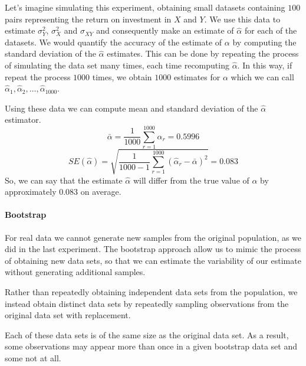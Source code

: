Let's imagine simulating this experiment, obtaining small datasets containing $100$ pairs representing the return on investment in $X$ and $Y$. We use this data to estimate $\sigma^2_Y$, $\sigma^2_X$ and $\sigma_{XY}$ and consequently make an estimate of $\hat \alpha$ for each of the datasets.
We would quantify the accuracy of the estimate of $\alpha$ by computing the standard deviation of the $\hat{\alpha}$ estimates. This can be done by repeating the process of simulating the data set many times, each time recomputing $\hat{\alpha}$.
In this way, if repeat the process $1000$ times, we obtain $1000$ estimates for $\alpha$ which we can call $\hat{\alpha}_1, \hat{\alpha}_2, \dots, \hat{\alpha}_{1000}$.


Using these data we can compute mean and standard deviation of the $\hat{\alpha}$ estimator.
\[
    \bar \alpha = \frac 1{1000}\sum_{r=1}^{1000} \hat{\alpha}_r = 0.5996
\]
\[
    SE(\hat \alpha) = \sqrt{\frac 1{1000-1}\sum_{r=1}^{1000} \left(\hat{\alpha}_r - \bar{\alpha}\right)^2} = 0.083
\]
So, we can say that the estimate $\hat\alpha$ will differ from the true value of $\alpha$ by approximately $0.083$ on average.

\paragraph*{Bootstrap}
For real data we cannot generate new samples from the original population, as we did in the last experiment. The bootstrap approach allow us to mimic the process of obtaining new data sets, so that we can estimate the variability of our estimate without generating additional samples.

Rather than repeatedly obtaining independent data sets from the population, we instead obtain distinct data sets by repeatedly sampling observations from the original data set with replacement.

Each of these data sets is of the same size as the original data set. As a result, some observations may appear more than once in a given bootstrap data set and some not at all.

